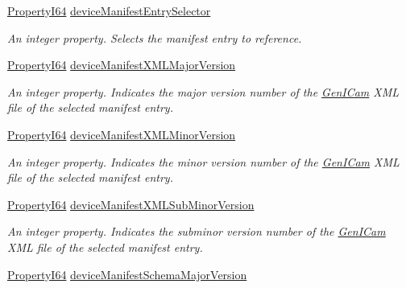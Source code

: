 \begin{DoxyCompactItemize}
\hyperlink{group___common_interface_ga81749b2696755513663492664a18a893}{Property\+I64} \hyperlink{classmv_i_m_p_a_c_t_1_1acquire_1_1_gen_i_cam_1_1_device_control_a2c1da302e9042160f42e6d7eb8e2b15a}{device\+Manifest\+Entry\+Selector}
\begin{DoxyCompactList}\small\item\em An integer property. Selects the manifest entry to reference. \end{DoxyCompactList}\item 
\hyperlink{group___common_interface_ga81749b2696755513663492664a18a893}{Property\+I64} \hyperlink{classmv_i_m_p_a_c_t_1_1acquire_1_1_gen_i_cam_1_1_device_control_aec803f5338cd284d08206c8881737ba2}{device\+Manifest\+X\+M\+L\+Major\+Version}
\begin{DoxyCompactList}\small\item\em An integer property. Indicates the major version number of the \hyperlink{namespacemv_i_m_p_a_c_t_1_1acquire_1_1_gen_i_cam}{Gen\+I\+Cam} X\+M\+L file of the selected manifest entry. \end{DoxyCompactList}\item 
\hyperlink{group___common_interface_ga81749b2696755513663492664a18a893}{Property\+I64} \hyperlink{classmv_i_m_p_a_c_t_1_1acquire_1_1_gen_i_cam_1_1_device_control_a8e20cdae0c0f4a3cdbf2b2ed1bccddf8}{device\+Manifest\+X\+M\+L\+Minor\+Version}
\begin{DoxyCompactList}\small\item\em An integer property. Indicates the minor version number of the \hyperlink{namespacemv_i_m_p_a_c_t_1_1acquire_1_1_gen_i_cam}{Gen\+I\+Cam} X\+M\+L file of the selected manifest entry. \end{DoxyCompactList}\item 
\hyperlink{group___common_interface_ga81749b2696755513663492664a18a893}{Property\+I64} \hyperlink{classmv_i_m_p_a_c_t_1_1acquire_1_1_gen_i_cam_1_1_device_control_ad4e70b4af0f3ed3fab5419436279ed5f}{device\+Manifest\+X\+M\+L\+Sub\+Minor\+Version}
\begin{DoxyCompactList}\small\item\em An integer property. Indicates the subminor version number of the \hyperlink{namespacemv_i_m_p_a_c_t_1_1acquire_1_1_gen_i_cam}{Gen\+I\+Cam} X\+M\+L file of the selected manifest entry. \end{DoxyCompactList}\item 
\hyperlink{group___common_interface_ga81749b2696755513663492664a18a893}{Property\+I64} \hyperlink{classmv_i_m_p_a_c_t_1_1acquire_1_1_gen_i_cam_1_1_device_control_a2cf29c5fda19d84c7243e8ba39f456ab}{device\+Manifest\+Schema\+Major\+Version}

\end{DoxyCompactItemize}
